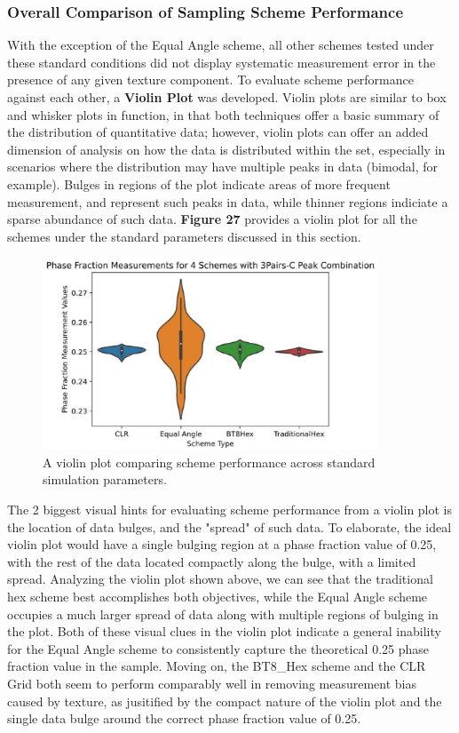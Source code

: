 \documentclass[10pt]{article}
\begin{document}
\subsubsection{Overall Comparison of Sampling Scheme Performance}
With the exception of the Equal Angle scheme, all other schemes tested under these standard conditions did not display
systematic measurement error in the presence of any given texture component. To evaluate scheme performance against each other, 
a \textbf{Violin Plot} was developed. Violin plots are similar to box and whisker plots in function, in that both techniques 
offer a basic summary of the distribution of quantitative data; however, violin plots can offer an added dimension of analysis on
how the data is distributed within the set, especially in scenarios where the distribution may have multiple peaks in data (bimodal, for example). Bulges in regions of the plot indicate areas of more frequent measurement, 
and represent such peaks in data, while thinner regions indiciate a sparse abundance of such data.
\textbf{Figure 27} provides a violin plot for all the schemes under the standard parameters discussed in this section.
\begin{figure}[h]
    \centering
    \includegraphics[width=10cm]{fig27}
    \caption{\label{tab1}A violin plot comparing scheme performance across standard simulation parameters.} 
    \end{figure}

The 2 biggest visual hints for evaluating scheme performance from a violin plot is the location of data bulges, and the "spread"
of such data. To elaborate, the ideal violin plot would have a single bulging region at a phase fraction value of 0.25, 
with the rest of the data located compactly along the bulge, with a limited spread. Analyzing the violin plot shown above, 
we can see that the traditional hex scheme best accomplishes both objectives, while the Equal Angle scheme occupies a much larger 
spread of data along with multiple regions of bulging in the plot. Both of these visual clues in the violin plot indicate a general inability for the Equal 
Angle scheme to consistently capture the theoretical 0.25 phase fraction value in the sample. Moving on, the BT8\_Hex scheme and the 
CLR Grid both seem to perform comparably well in removing measurement bias caused by texture, as jusitified by the compact nature of the 
violin plot and the single data bulge around the correct phase fraction value of 0.25. 
\end{document}
